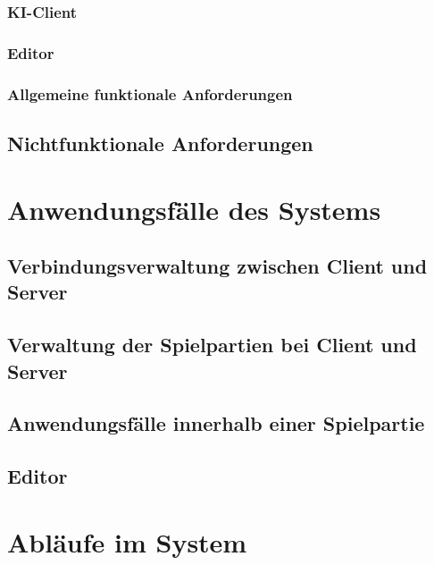 \documentclass{uulm-assignment}
\begin{document}
\clearpage
\subsubsection{KI-Client}

\subsubsection{Editor}


\clearpage
\subsubsection{Allgemeine funktionale Anforderungen}


\clearpage
\subsection{Nichtfunktionale Anforderungen}


\clearpage
\section{Anwendungsfälle des Systems}
\subsection{Verbindungsverwaltung zwischen Client und Server}


\subsection{Verwaltung der Spielpartien bei Client und Server}


\subsection{Anwendungsfälle innerhalb einer Spielpartie}


\subsection{Editor}


\clearpage
\section{Abläufe im System}
\end{document}
